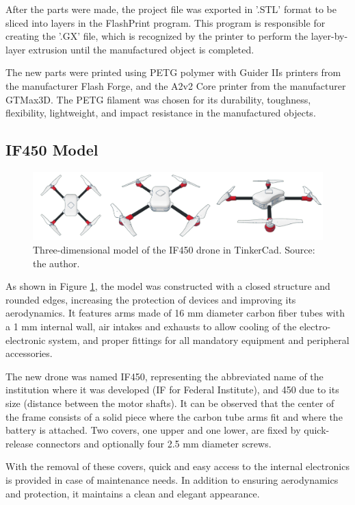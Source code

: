 \documentclass[conference]{IEEEtran}
\begin{document}
After the parts were made, the project file was exported in '.STL' format to be sliced into layers in the FlashPrint program. This program is responsible for creating the '.GX' file, which is recognized by the printer to perform the layer-by-layer extrusion until the manufactured object is completed.

The new parts were printed using PETG polymer with Guider IIs printers from the manufacturer Flash Forge, and the A2v2 Core printer from the manufacturer GTMax3D. The PETG filament was chosen for its durability, toughness, flexibility, lightweight, and impact resistance in the manufactured objects.

\subsection{IF450 Model}

\begin{figure}[!htb]
    \centering
    \includegraphics[scale=0.14]{img/IF450.png} 
    \caption{Three-dimensional model of the IF450 drone in TinkerCad. Source: the author.}
    \label{fig:IF450}
\end{figure}

As shown in Figure \ref{fig:IF450}, the model was constructed with a closed structure and rounded edges, increasing the protection of devices and improving its aerodynamics. It features arms made of 16 mm diameter carbon fiber tubes with a 1 mm internal wall, air intakes and exhausts to allow cooling of the electro-electronic system, and proper fittings for all mandatory equipment and peripheral accessories.

The new drone was named IF450, representing the abbreviated name of the institution where it was developed (IF for Federal Institute), and 450 due to its size (distance between the motor shafts). It can be observed that the center of the frame consists of a solid piece where the carbon tube arms fit and where the battery is attached. Two covers, one upper and one lower, are fixed by quick-release connectors and optionally four 2.5 mm diameter screws.

With the removal of these covers, quick and easy access to the internal electronics is provided in case of maintenance needs. In addition to ensuring aerodynamics and protection, it maintains a clean and elegant appearance.
\end{document}
